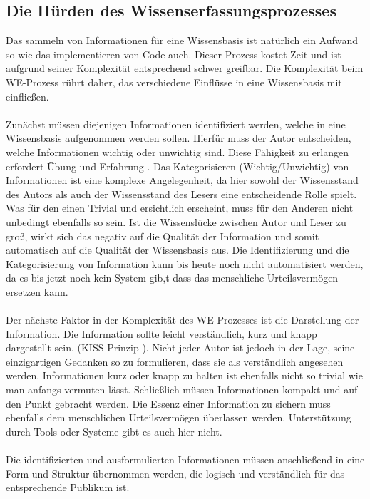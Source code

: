 \documentclass[a4paper,12pt,twoside]{scrartcl}
\begin{document}
\subsection{Die Hürden des Wissenserfassungsprozesses}
\label{Huerden}
Das sammeln von Informationen für eine Wissensbasis ist natürlich ein Aufwand so wie das implementieren von Code auch. Dieser Prozess kostet Zeit und ist aufgrund seiner Komplexität entsprechend schwer greifbar. Die Komplexität beim WE-Prozess rührt daher, das verschiedene Einflüsse in eine Wissensbasis mit einfließen.
\\\\
Zunächst müssen diejenigen Informationen identifiziert werden, welche in eine Wissensbasis aufgenommen werden sollen. Hierfür muss der Autor entscheiden, welche Informationen wichtig oder unwichtig sind. Diese Fähigkeit zu erlangen erfordert Übung und Erfahrung \cite{At2005}. Das Kategorisieren (Wichtig/Unwichtig) von Informationen ist eine komplexe Angelegenheit, da hier sowohl der Wissensstand des Autors als auch der Wissensstand des Lesers eine entscheidende Rolle spielt. Was für den einen Trivial und ersichtlich erscheint, muss für den Anderen nicht unbedingt ebenfalls so sein. Ist die Wissenslücke zwischen Autor und Leser zu groß, wirkt sich das negativ auf die Qualität der Information und somit automatisch auf die Qualität der Wissensbasis aus. Die Identifizierung und die Kategorisierung von Information kann bis heute noch nicht automatisiert werden, da es bis jetzt noch kein System gib,t dass das menschliche Urteilsvermögen ersetzen kann.
\\\\
Der nächste Faktor in der Komplexität des WE-Prozesses ist die Darstellung der Information. Die Information sollte leicht verständlich, kurz und knapp dargestellt sein. (KISS-Prinzip\footnotemark
). Nicht jeder Autor ist jedoch in der Lage, seine einzigartigen Gedanken so zu formulieren, dass sie als verständlich angesehen werden. Informationen kurz oder knapp zu halten ist ebenfalls nicht so trivial wie man anfangs vermuten lässt. Schließlich müssen Informationen kompakt und auf den Punkt gebracht werden. Die Essenz einer Information zu sichern muss ebenfalls dem menschlichen Urteilsvermögen überlassen werden. Unterstützung durch Tools oder Systeme gibt es auch hier nicht.
\\\\
Die identifizierten und ausformulierten Informationen müssen anschließend in eine Form und Struktur übernommen werden, die logisch und verständlich für das entsprechende Publikum ist. 
\end{document}
